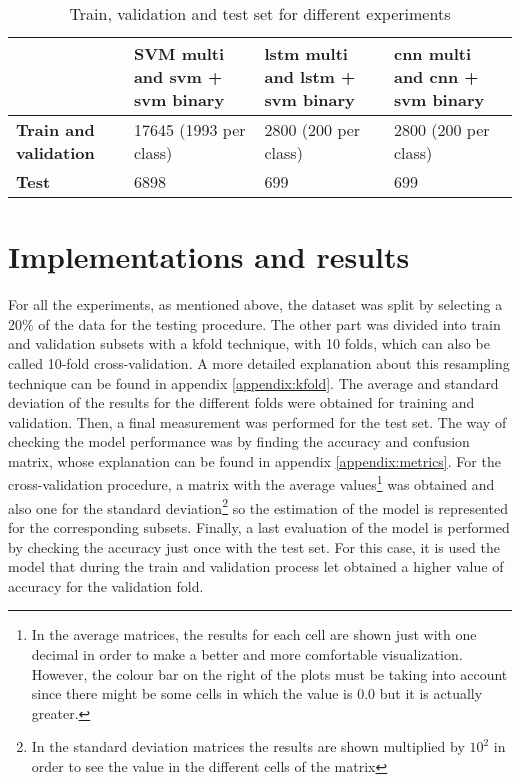 	\begin{table}[ht]
		\centering
		\begin{tabular}{|| m{7em} | m{10em} | m{10em} | m{10em} ||}
			\hline
			& \textbf{SVM multi and \acrshort{svm} + \acrshort{svm} binary} & \textbf{\acrshort{lstm} multi and \acrshort{lstm} + \acrshort{svm} binary} & \textbf{\acrshort{cnn} multi and \acrshort{cnn} + \acrshort{svm} binary}  \\
			\hline\hline
			\textbf{Train and validation} & 17645 (1993 per class) & 2800 (200 per class) & 2800 (200 per class) \\
			\hline
			\textbf{Test} & 6898 & 699 & 699 \\
			\hline                    
		\end{tabular}
		\caption{Train, validation and test set for different experiments}
		\label{table:8}
	\end{table}

\section{Implementations and results}

	For all the experiments, as mentioned above, the dataset was split by selecting a 20\% of the data for the testing procedure. The other part was divided into train and validation subsets with a \acrlong{kfold} technique, with 10 folds, which can also be called 10-fold cross-validation. A more detailed explanation about this resampling technique can be found in appendix \ref{appendix:kfold}. The average and standard deviation of the results for the different folds were obtained for training and validation. Then, a final measurement was performed for the test set. The way of checking the model performance was by finding the accuracy and confusion matrix, whose explanation can be found in appendix \ref{appendix:metrics}. For the cross-validation procedure, a matrix with the average values\footnote{In the average matrices, the results for each cell are shown just with one decimal in order to make a better and more comfortable visualization. However, the colour bar on the right of the plots must be taking into account since there might be some cells in which the value is $0.0$ but it is actually greater.} was obtained and also one for the standard deviation\footnote{In the standard deviation matrices the results are shown multiplied by $10^{2}$ in order to see the value in the different cells of the matrix} so the estimation of the model is represented for the corresponding subsets. Finally, a last evaluation of the model is performed by checking the accuracy just once with the test set. For this case, it is used the model that during the train and validation process let obtained a higher value of accuracy for the validation fold.
	
